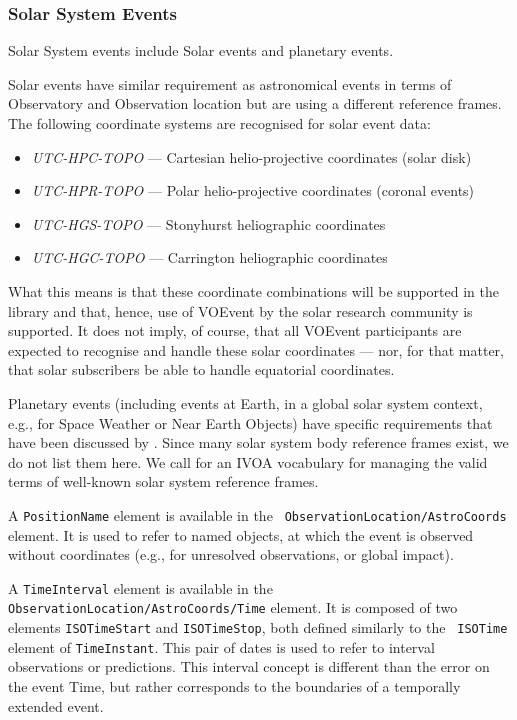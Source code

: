 \documentclass[11pt,a4paper]{ivoa}
\begin{document}
\subsubsection{Solar System Events}
\label{sec:3.4.4}
Solar System events include Solar events and planetary events. 

Solar events have similar requirement as astronomical events in terms of 
Observatory and Observation location but are using a different reference frames.
The following coordinate systems are recognised for solar event data: 
\begin{itemize}
\item \emph{UTC-HPC-TOPO} --- Cartesian helio-projective coordinates (solar 
disk)
\item \emph{UTC-HPR-TOPO} --- Polar helio-projective coordinates (coronal 
events)
\item \emph{UTC-HGS-TOPO} --- Stonyhurst heliographic coordinates
\item \emph{UTC-HGC-TOPO} --- Carrington heliographic coordinates
\end{itemize}

What this means is that these coordinate combinations will be supported in the 
library and that, hence, use of VOEvent by the solar research community is 
supported. It does not imply, of course, that all VOEvent participants are 
expected to recognise and handle these solar coordinates --- nor, for that 
matter, that solar subscribers be able to handle equatorial coordinates. 

Planetary events (including events at Earth, in a global solar system context,
e.g., for Space Weather or Near Earth Objects) have specific requirements that 
have been discussed by \citet{2018arXiv181112680C}. Since many solar system body 
reference frames exist, we do not list them here. We call for an IVOA vocabulary 
for managing the valid terms of well-known solar system reference frames.

A {\tt PositionName} element is available in the {\tt 
ObservationLocation/AstroCoords} element. It is used to refer to named objects, 
at which the event is observed without coordinates (e.g., for unresolved 
observations, or global impact).  

A {\tt TimeInterval} element is available in the {\tt 
ObservationLocation/AstroCoords/Time} element. It is composed of two elements 
{\tt ISOTimeStart} and {\tt ISOTimeStop}, both defined similarly to the {\tt 
ISOTime} element of {\tt TimeInstant}. This pair of dates is used to refer to 
interval observations or predictions. This interval concept is different than 
the error on the event Time, but rather corresponds to the boundaries of a 
temporally extended event. 
\end{document}
